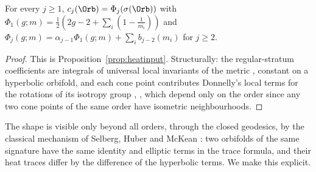 \begin{proposition}\label{thm:locality}
For every $j\ge1$, $c_j(\Orb)=\Phi_j(\sigma(\Orb))$ with $\Phi_1(g;m)=\frac12(2g-2+\sum_i(1-\frac1{m_i}))$ and
$\Phi_j(g;m)=\alpha_{j-1}\Phi_1(g;m)+\sum_ib_{j-2}(m_i)$ for $j\ge2$.
\end{proposition}

\begin{proof}
This is Proposition~\ref{prop:heatinput}. Structurally: the regular-stratum coefficients are
integrals of universal local invariants of the metric \cite[Def.~4.7]{dggw2008}, constant on a
hyperbolic orbifold, and each cone point contributes Donnelly's local terms for the rotations of its
isotropy group \cite[\S4.1]{dggw2008}, \cite{donnelly1976}, which depend only on the order since any
two cone points of the same order have isometric neighbourhoods.
\end{proof}



The shape is visible only beyond all orders, through the closed geodesics, by the classical
mechanism of Selberg, Huber and McKean \cite{huber1959,mckean1972,hejhal1976}: two orbifolds of the
same signature have the same identity and elliptic terms in the trace formula, and their heat traces
differ by the difference of the hyperbolic terms. We make this explicit.


